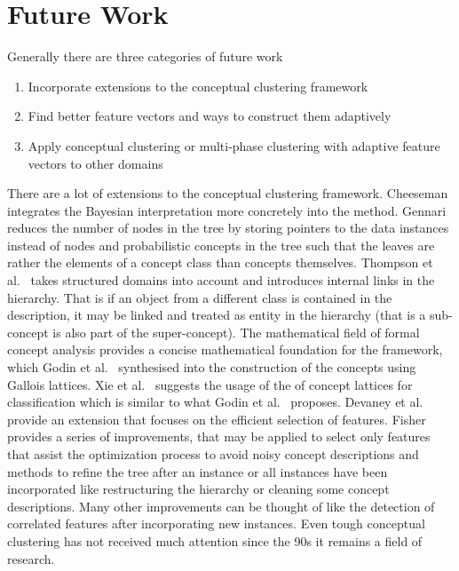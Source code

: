 \section{Future Work}\label{\positionnumber}
Generally there are three categories of future work 
\begin{enumerate}
    \item Incorporate extensions to the conceptual clustering framework
    \item Find better feature vectors and ways to construct them adaptively
    \item Apply conceptual clustering or multi-phase clustering with adaptive feature vectors to other domains
\end{enumerate}{}
There are a lot of extensions to the conceptual clustering framework. Cheeseman~\cite{cheeseman1988autoclass} integrates the Bayesian interpretation more concretely into the method. Gennari~\cite{classit} reduces the number of nodes in the tree by storing pointers to the data instances instead of nodes and probabilistic concepts in the tree such that the leaves are rather the elements of a concept class than concepts themselves. Thompson et al.~\cite{thompson1991concept} takes structured domains into account and introduces internal links in the hierarchy. That is if an object from a different class is contained in the description, it may be linked and treated as entity in the hierarchy (that is a sub-concept is also part of the super-concept). The mathematical field of formal concept analysis provides a concise mathematical foundation for the framework, which Godin et al.~\cite{doi:10.1111/j.1467-8640.1995.tb00031.x} synthesised into the construction of the concepts using Gallois lattices. Xie et al.~\cite{xie2002concept} suggests the usage of the of concept lattices for classification which is similar to what Godin et al.~\cite{doi:10.1111/j.1467-8640.1995.tb00031.x} proposes. Devaney et al.~\cite{devaney1997efficient} provide an extension that focuses on the efficient selection of features. Fisher~\cite{fisher1996iterative} provides a series of improvements, that may be applied to select only features that assist the optimization process to avoid noisy concept descriptions and methods to refine the tree after an instance or all instances have been incorporated like restructuring the hierarchy or cleaning some concept descriptions. Many other improvements can be thought of like the detection of correlated features after incorporating new instances. Even tough conceptual clustering has not received much attention since the 90s it remains a field of research. \\


